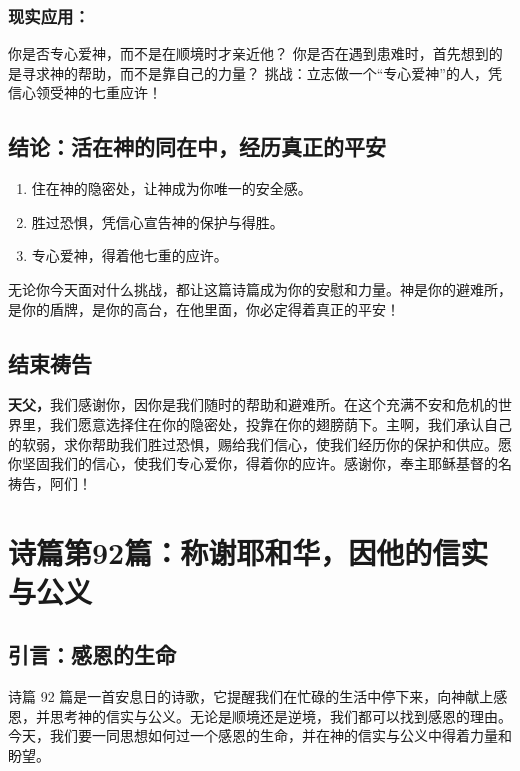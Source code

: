 \documentclass[a4paper, 12pt]{article}
\begin{document}
\subsubsection*{现实应用：}

你是否专心爱神，而不是在顺境时才亲近他？
你是否在遇到患难时，首先想到的是寻求神的帮助，而不是靠自己的力量？
挑战：立志做一个“专心爱神”的人，凭信心领受神的七重应许！

\subsection*{结论：活在神的同在中，经历真正的平安}
\begin{enumerate}
    \item 住在神的隐密处，让神成为你唯一的安全感。

    \item 胜过恐惧，凭信心宣告神的保护与得胜。

    \item 专心爱神，得着他七重的应许。

\end{enumerate}

无论你今天面对什么挑战，都让这篇诗篇成为你的安慰和力量。神是你的避难所，是你的盾牌，是你的高台，在他里面，你必定得着真正的平安！

\subsection*{结束祷告}
\textbf{天父，}我们感谢你，因你是我们随时的帮助和避难所。在这个充满不安和危机的世界里，我们愿意选择住在你的隐密处，投靠在你的翅膀荫下。主啊，我们承认自己的软弱，求你帮助我们胜过恐惧，赐给我们信心，使我们经历你的保护和供应。愿你坚固我们的信心，使我们专心爱你，得着你的应许。感谢你，奉主耶稣基督的名祷告，阿们！
\newpage
\section{诗篇第92篇：称谢耶和华，因他的信实与公义}

\subsection*{引言：感恩的生命}
诗篇 92 篇是一首安息日的诗歌，它提醒我们在忙碌的生活中停下来，向神献上感恩，并思考神的信实与公义。无论是顺境还是逆境，我们都可以找到感恩的理由。今天，我们要一同思想如何过一个感恩的生命，并在神的信实与公义中得着力量和盼望。
\end{document}
